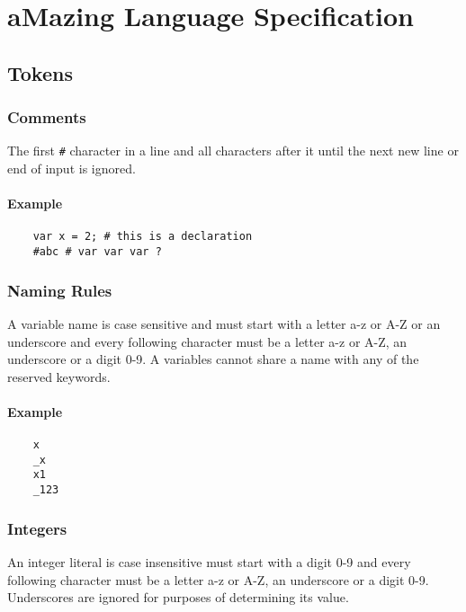 \section{aMazing Language Specification}

\subsection{Tokens}

\subsubsection{Comments}

The first \verb|#| character in a line and all characters after it until the next new line or end of input is ignored.

\paragraph{Example}

\begin{verbatim}
    var x = 2; # this is a declaration
    #abc # var var var ?
\end{verbatim}

\subsubsection{Naming Rules}

A variable name is case sensitive and must start with a letter a-z or A-Z or an underscore and every following character must be a letter a-z or A-Z, an underscore or a digit 0-9. A variables cannot share a name with any of the reserved keywords.

\paragraph{Example}

\begin{verbatim}
    x
    _x
    x1
    _123    
\end{verbatim}

\subsubsection{Integers}

An integer literal is case insensitive must start with a digit 0-9 and every following character must be a letter a-z or A-Z, an underscore or a digit 0-9. Underscores are ignored for purposes of determining its value.

